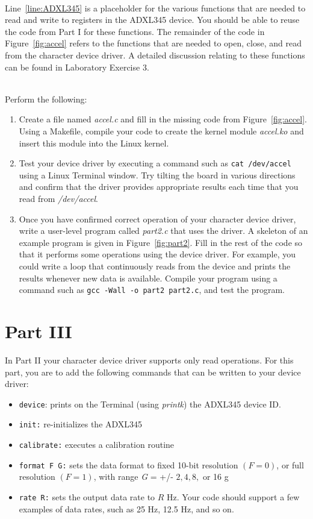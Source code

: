 \documentclass[epsfig,10pt,fullpage]{article}
\begin{document}
~\\
Line~\ref{line:ADXL345} is a placeholder for the various functions that are needed to read
and write to registers in the ADXL345 device. You should be able to reuse the code from 
Part I for these functions. The remainder of the code in Figure~\ref{fig:accel}
refers to the functions that are needed to open, close, and read from the character device driver.
A detailed discussion relating to these functions can be found in Laboratory Exercise 3.

~\\
\noindent
Perform the following:

\begin{enumerate}
\item Create a file named {\it accel.c} and fill in the missing code from Figure~\ref{fig:accel}.
Using a Makefile, compile your code to create the 
kernel module {\it accel.ko} and insert this module into the Linux kernel. 
\item Test your device driver by executing a command such as \texttt{cat /dev/accel} using a
Linux Terminal window. Try tilting the board in various directions and confirm that the
driver provides appropriate results each time that you read from {\it /dev/accel}.
\item
Once you have confirmed correct operation of your character device driver, write a user-level
program called {\it part2.c} that uses the driver.
A skeleton of an example program is given in Figure~\ref{fig:part2}. Fill in the rest 
of the code so that it performs some operations using the device driver. For example, you could 
write a loop that continuously reads from the device and prints the results whenever new
data is available. Compile your program using a command such as \texttt{gcc -Wall -o part2
part2.c}, and test the program.
\end{enumerate}

\noindent
\section*{Part III}

In Part II your character device driver supports only read operations. For this part, you
are to add the following commands that can be written to your device driver:

\begin{itemize}
		  \item \texttt{device}: prints on the Terminal (using {\it printk}) the ADXL345 device ID.
		  \item \texttt{init:} re-initializes the ADXL345
		  \item \texttt{calibrate:} executes a calibration routine
		  \item \texttt{format F G:} sets the data format to fixed 10-bit resolution $(F = 0)$, or
					 full resolution $(F = 1)$, with range {\it G} = +/- $2, 4, 8,$ or 16 g
		  \item \texttt{rate R:} sets the output data rate to $R$ Hz. Your code should support
					 a few examples of data rates, such as 25 Hz, 12.5 Hz, and so on.
\end{itemize}
\end{document}
